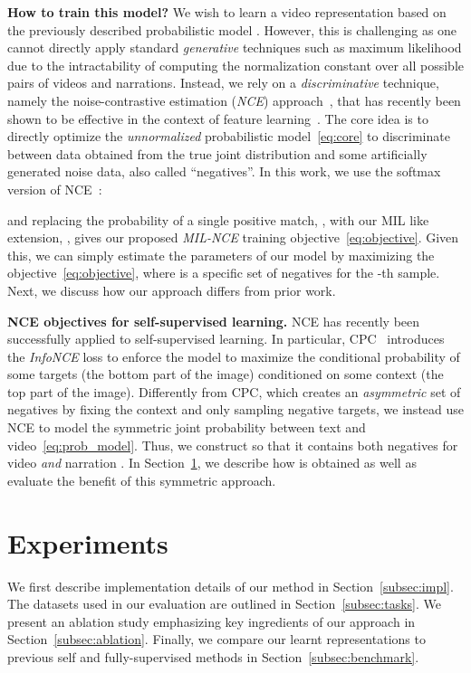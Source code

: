 \documentclass[10pt,twocolumn,letterpaper]{article}
\begin{document}
\noindent
\textbf{How to train this model?}
We wish to learn a video representation based on the previously described probabilistic model .
However, this is challenging as one cannot directly apply standard \emph{generative} techniques such as maximum likelihood due to the intractability of computing the normalization constant over all possible pairs of videos and narrations.
Instead, we rely on a \emph{discriminative} technique, namely the noise-contrastive estimation (\emph{NCE}) approach~\cite{gutmann2010noise,jozefowicz2016exploring}, that has recently been shown to be effective in the context of feature learning~\cite{henaff2019data,oord2018representation}.
The core idea is to directly optimize the \emph{unnormalized} probabilistic model~\eqref{eq:core} to discriminate between data obtained from the true joint distribution  and some artificially generated noise data, also called ``negatives''. 
In this work, we use the softmax version of NCE~\cite{jozefowicz2016exploring}:

and replacing the probability of a single positive match, , with
our MIL like extension, , gives our proposed
\emph{MIL-NCE} training objective~\eqref{eq:objective}.
Given this, we can simply estimate the parameters of our model by maximizing the objective~\eqref{eq:objective}, where  is a specific set of negatives for the -th sample.
Next, we discuss how our approach differs from prior work.

\noindent
\textbf{NCE objectives for self-supervised learning.}
NCE has recently been successfully applied to self-supervised learning.
In particular, CPC~\cite{henaff2019data,oord2018representation} introduces the \emph{InfoNCE} loss to enforce the model to maximize the conditional probability of some targets (\eg the bottom part of the image) conditioned on some context (\eg the top part of the image).
Differently from CPC, which creates an \emph{asymmetric} set of negatives by fixing the context and only sampling negative targets, we instead use NCE to model the symmetric joint probability between text and video~\eqref{eq:prob_model}.
Thus, we construct  so that it contains both negatives for video  \emph{and} narration .
In Section~\ref{sec:exp}, we describe how  is obtained as well as evaluate the benefit of this symmetric approach.


\section{Experiments}
\label{sec:exp}
We first describe implementation details of our method in Section~\ref{subsec:impl}. 
The datasets used in our evaluation are outlined in Section~\ref{subsec:tasks}.
We present an ablation study emphasizing key ingredients of our approach in Section~\ref{subsec:ablation}.
Finally, we compare our learnt representations to previous self and fully-supervised methods in Section~\ref{subsec:benchmark}.
\end{document}
